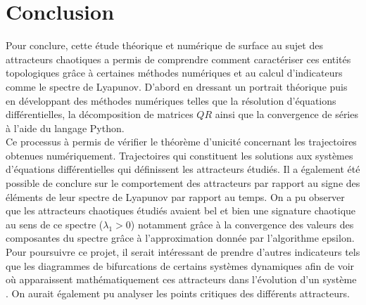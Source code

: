 \section{Conclusion} \label{sec: conclusion}
    Pour conclure, cette étude théorique et numérique de surface au sujet des attracteurs chaotiques a permis de comprendre comment caractériser ces entités topologiques grâce à certaines méthodes numériques et au calcul d'indicateurs comme le spectre de Lyapunov. D'abord en dressant un portrait théorique puis en développant des méthodes numériques telles que la résolution d'équations différentielles, la décomposition de matrices $QR$ ainsi que la convergence de séries à l'aide du langage Python. \\

    Ce processus à permis de vérifier le théorème d'unicité concernant les trajectoires obtenues numériquement. Trajectoires qui constituent les solutions aux systèmes d'équations différentielles qui définissent les attracteurs étudiés. Il a également été possible de conclure sur le comportement des attracteurs par rapport au signe des éléments de leur spectre de Lyapunov par rapport au temps. On a pu observer que les attracteurs chaotiques étudiés avaient bel et bien une signature chaotique au sens de ce spectre ($\lambda_1 > 0$) notamment grâce à la convergence des valeurs des composantes du spectre grâce à l'approximation donnée par l'algorithme epsilon. \\

    Pour poursuivre ce projet, il serait intéressant de prendre d'autres indicateurs tels que les diagrammes de bifurcations de certains systèmes dynamiques afin de voir où apparaissent mathématiquement ces attracteurs dans l'évolution d'un système \cite{bifurcation}. On aurait également pu analyser les points critiques des différents attracteurs.